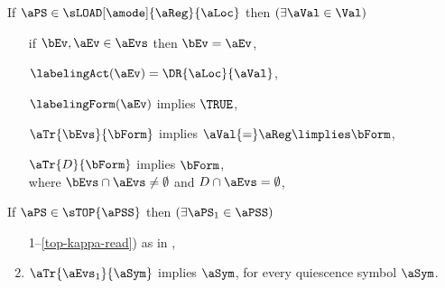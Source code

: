 \begin{definition}

  \noindent
  If $\aPS \in \sLOAD[\amode]{\aReg}{\aLoc}$ then %
  $(\exists\aVal\in\Val)$
  \begin{enumerate}[topsep=0pt]
  \item[{\labeltext[L1]{L1)}{L1}}] 
    if $\bEv,\aEv\in\aEvs$ then $\bEv=\aEv$,
  \item[{\labeltext[L2]{L2)}{L2}}]
    $\labelingAct(\aEv) = \DR{\aLoc}{\aVal}$,
  \item[{\labeltext[L3]{L3)}{L3}}]
    $\labelingForm(\aEv)$ implies $\TRUE$,
  \item[{\labeltext[L4]{L4)}{L4}}]
    $\aTr{\bEvs}{\bForm}$ implies $\aVal{=}\aReg\limplies\bForm$, 
  \item[{\labeltext[L5]{L5)}{L5}}]
    $\aTr{\cEvs}{\bForm}$ implies $\bForm$, %
    \\ where $\bEvs\cap\aEvs\neq\emptyset$ and $\cEvs\cap\aEvs=\emptyset$,
  \end{enumerate}
  If $\aPS \in \sTOP{\aPSS}$ then
  $(\exists\aPS_1\in\aPSS)$
  \begin{enumerate}[topsep=0pt]
    \setcounter{enumi}{\value{pomsetPreTopCount}}
  \item[1--\ref{top-kappa-read})] as in ,    
  \item $\aTr{\aEvs_1}{\aSym}$ implies $\aSym$, for every quiescence symbol $\aSym$.
  \end{enumerate}
\end{definition}
